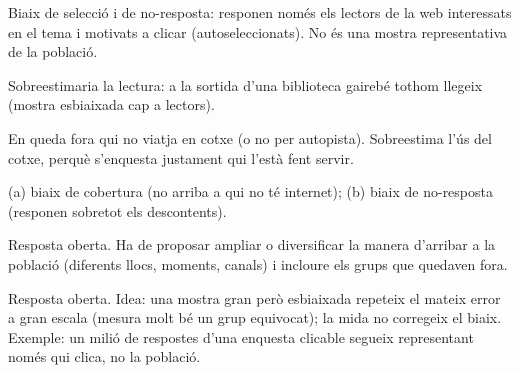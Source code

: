 \begin{solucions}
\begin{sollist}
  \item Biaix de selecció i de no-resposta: responen només els lectors de la web
        interessats en el tema i motivats a clicar (autoseleccionats). No és una mostra
        representativa de la població.
  \item Sobreestimaria la lectura: a la sortida d'una biblioteca gairebé tothom llegeix
        (mostra esbiaixada cap a lectors).
  \item En queda fora qui no viatja en cotxe (o no per autopista). Sobreestima l'ús del
        cotxe, perquè s'enquesta justament qui l'està fent servir.
  \item (a) biaix de cobertura (no arriba a qui no té internet); (b) biaix de no-resposta
        (responen sobretot els descontents).
  \item Resposta oberta. Ha de proposar ampliar o diversificar la manera d'arribar a la
        població (diferents llocs, moments, canals) i incloure els grups que quedaven fora.
  \item Resposta oberta. Idea: una mostra gran però esbiaixada repeteix el mateix error a
        gran escala (mesura molt bé un grup equivocat); la mida no corregeix el biaix.
        Exemple: un milió de respostes d'una enquesta clicable segueix representant només
        qui clica, no la població.
\end{sollist}
\end{solucions}
